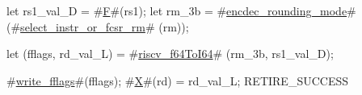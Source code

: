 let rs1_val_D = #\hyperref[sailRISCVzF]{F}#(rs1);
let rm_3b     = #\hyperref[sailRISCVzencdeczyroundingzymode]{encdec\_rounding\_mode}# (#\hyperref[sailRISCVzselectzyinstrzyorzyfcsrzyrm]{select\_instr\_or\_fcsr\_rm}#  (rm));

let (fflags, rd_val_L) = #\hyperref[sailRISCVzriscvzyf64ToI64]{riscv\_f64ToI64}# (rm_3b, rs1_val_D);

#\hyperref[sailRISCVzwritezyfflags]{write\_fflags}#(fflags);
#\hyperref[sailRISCVzX]{X}#(rd) = rd_val_L;
RETIRE_SUCCESS
